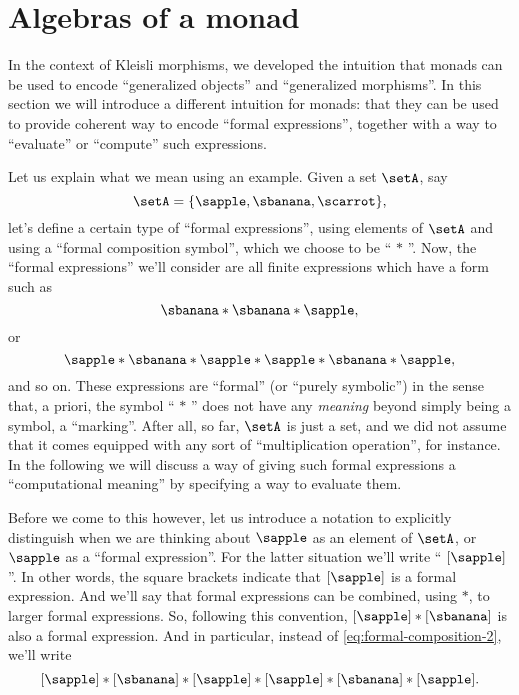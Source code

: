 

\section{Algebras of a monad}
\label{sec:Eilenberg-Moore}




In the context of Kleisli morphisms, we developed the intuition that monads can be used to encode ``generalized objects'' and ``generalized morphisms''. In this section we will introduce a different intuition for monads: that they can be used to provide coherent way to encode ``formal expressions'', together with a way to ``evaluate'' or ``compute'' such expressions. 

Let us explain what we mean using an example. Given a set $\setA$, say
\begin{equation}
\setA = \{ \sapple, \sbanana, \scarrot \},
\end{equation}
let's define a certain type of ``formal expressions'', using elements of $\setA$ and using a ``formal composition symbol'', which we choose to be `` $*$ ''. Now, the ``formal expressions'' we'll consider are all finite expressions which have a form such as 
\begin{equation}\label{eq:formal-composition-1}
 \sbanana * \sbanana * \sapple,
\end{equation}
or
\begin{equation}\label{eq:formal-composition-2}
\sapple * \sbanana * \sapple * \sapple * \sbanana * \sapple,
\end{equation}
and so on. 
These expressions are ``formal'' (or ``purely symbolic'') in the sense that, a priori, the symbol `` $*$ '' does not have any \emph{meaning} beyond simply being a symbol, a ``marking''. After all, so far, $\setA$ is just a set, and we did not assume that it comes equipped with any sort of ``multiplication operation'', for instance. In the following we will discuss a way of giving such formal expressions a ``computational meaning'' by specifying a way to evaluate them. 


Before we come to this however, let us introduce a notation to explicitly distinguish when we are thinking about $\sapple$ as an element of $\setA$, or $\sapple$ as a ``formal expression''. For the latter situation we'll write `` $[\sapple]$ ''.
In other words, the square brackets indicate that $[\sapple]$ is a formal expression. And we'll say that formal expressions can be combined, using $*$, to larger formal expressions. So, following this convention, $[\sapple] * [\sbanana]$ is also a formal expression. And in particular, instead of \cref{eq:formal-composition-2}, we'll write
\begin{equation}\label{eq:formal-composition-bracketed}
[\sapple] * [\sbanana] * [\sapple] * [\sapple] * [\sbanana] * [\sapple].
\end{equation}


